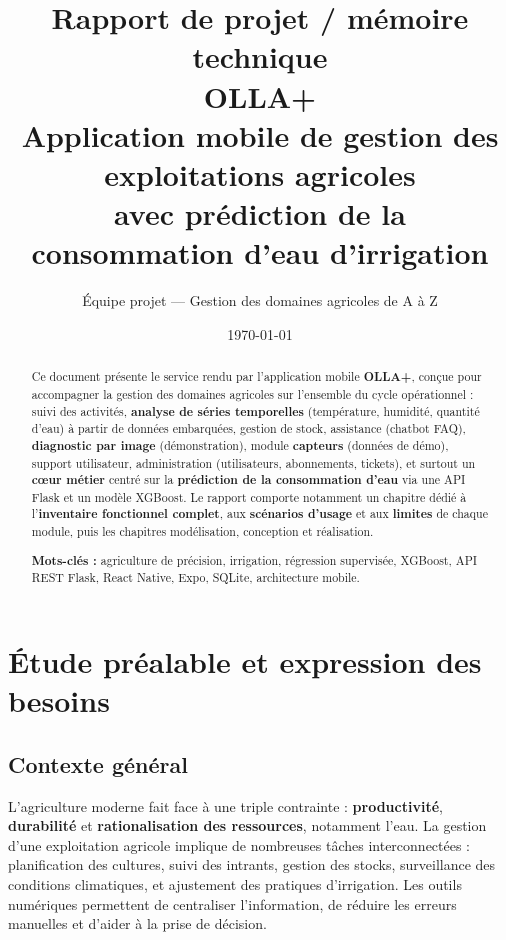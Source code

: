 \documentclass[12pt,a4paper,twoside,openright]{report}
\title{
  \vspace{1cm}
  {\Large Rapport de projet / mémoire technique}\\[0.8cm]
  {\LARGE \textbf{OLLA+}}\\[0.4cm]
  {\large Application mobile de gestion des exploitations agricoles\\avec prédiction de la consommation d'eau d'irrigation}\\[1.2cm]
}
\author{Équipe projet — Gestion des domaines agricoles de A à Z}
\date{\today}
\begin{document}
\maketitle
\thispagestyle{empty}
\cleardoublepage

\begin{abstract}
Ce document présente le service rendu par l'application mobile \textbf{OLLA+}, conçue pour accompagner la gestion des domaines agricoles sur l'ensemble du cycle opérationnel : suivi des activités, \textbf{analyse de séries temporelles} (température, humidité, quantité d'eau) à partir de données embarquées, gestion de stock, assistance (chatbot FAQ), \textbf{diagnostic par image} (démonstration), module \textbf{capteurs} (données de démo), support utilisateur, administration (utilisateurs, abonnements, tickets), et surtout un \textbf{cœur métier} centré sur la \textbf{prédiction de la consommation d'eau} via une API Flask et un modèle XGBoost. Le rapport comporte notamment un chapitre dédié à l'\textbf{inventaire fonctionnel complet}, aux \textbf{scénarios d'usage} et aux \textbf{limites} de chaque module, puis les chapitres modélisation, conception et réalisation.

\textbf{Mots-clés :} agriculture de précision, irrigation, régression supervisée, XGBoost, API REST Flask, React Native, Expo, SQLite, architecture mobile.
\end{abstract}

\tableofcontents
\listoffigures
\listoftables
\cleardoublepage

\chapter{Étude préalable et expression des besoins}

\section{Contexte général}

L'agriculture moderne fait face à une triple contrainte : \textbf{productivité}, \textbf{durabilité} et \textbf{rationalisation des ressources}, notamment l'eau. La gestion d'une exploitation agricole implique de nombreuses tâches interconnectées : planification des cultures, suivi des intrants, gestion des stocks, surveillance des conditions climatiques, et ajustement des pratiques d'irrigation. Les outils numériques permettent de centraliser l'information, de réduire les erreurs manuelles et d'aider à la prise de décision.
\end{document}

